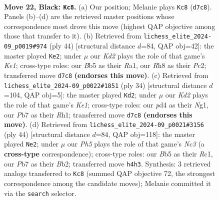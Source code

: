 \documentclass[11pt]{article}
\begin{document}
\begin{figure}[p]
\label{fig:thought-m41}
\end{figure}

\clearpage

\begin{figure}[p]\centering
\begin{subfigure}{0.46\textwidth}\centering
\resizebox{\linewidth}{!}{%
\newchessgame
\chessboard[
  setfen={5b1r/1p1kpp1n/1B1p2p1/1b6/3PP2p/rP2RP2/P4QPP/2K4R b - - 3 22},
  showmover=false,
  pgfstyle=straightmove, color=movearrow, markmove={d7-c8}
]}
\caption{}
\end{subfigure}\hfill
\begin{subfigure}{0.46\textwidth}\centering
\resizebox{\linewidth}{!}{%
\newchessgame
\chessboard[
  setfen={r1b3R1/pp1k1p2/4pq1P/2p5/P2pP3/N2P4/1PPB3p/R3K3 w Q - 2 23},
  showmover=false,
  pgfstyle=straightmove, color=movearrow, markmove={e1-e2}
]}
\caption{}
\end{subfigure}
\\[4pt]
\begin{subfigure}{0.46\textwidth}\centering
\resizebox{\linewidth}{!}{%
\newchessgame
\chessboard[
  setfen={r1b1k2r/p2p1ppp/1p2p3/4P3/5P2/1Pn5/2P3PP/R3KBNR w Kkq - 0 18},
  showmover=false,
  pgfstyle=straightmove, color=movearrow, markmove={e1-d2}
]}
\caption{}
\end{subfigure}\hfill
\begin{subfigure}{0.46\textwidth}\centering
\resizebox{\linewidth}{!}{%
\newchessgame
\chessboard[
  setfen={3rrqk1/p5pp/1p2p3/2p1Rp2/2P5/1PN5/PBB2PPP/2R3K1 w - - 0 23},
  showmover=false,
  pgfstyle=straightmove, color=movearrow, markmove={c3-e2}
]}
\caption{}
\end{subfigure}
\caption{\textbf{Move 22, Black: \texttt{Kc8}.} (a) Our position; Melanie plays \texttt{Kc8} (\texttt{d7c8}). Panels (b)--(d) are the retrieved master positions whose correspondence most drove this move (highest QAP objective among those that transfer to it). (b) Retrieved from \texttt{lichess\_elite\_2024-09\_p0019\#974} (ply 44) [structural distance $d$=84, QAP obj=42]: the master played \texttt{Ke2}; under $\mu$ our \emph{Kd2} plays the role of that game's \emph{Ke1}; cross-type roles: our \emph{B}b5 as their \emph{R}a1, our \emph{R}h8 as their \emph{P}c2; transferred move \texttt{d7c8} \textbf{(endorses this move)}. (c) Retrieved from \texttt{lichess\_elite\_2024-09\_p0022\#1851} (ply 34) [structural distance $d$=104, QAP obj=5]: the master played \texttt{Kd2}; under $\mu$ our \emph{Kd2} plays the role of that game's \emph{Ke1}; cross-type roles: our \emph{p}d4 as their \emph{N}g1, our \emph{P}b7 as their \emph{R}h1; transferred move \texttt{d7c8} \textbf{(endorses this move)}. (d) Retrieved from \texttt{lichess\_elite\_2024-09\_p0021\#3156} (ply 44) [structural distance $d$=84, QAP obj=118]: the master played \texttt{Ne2}; under $\mu$ our \emph{Ph5} plays the role of that game's \emph{Nc3} (a \textbf{cross-type} correspondence); cross-type roles: our \emph{B}b5 as their \emph{R}c1, our \emph{P}b7 as their \emph{B}b2; transferred move \texttt{h4h3}. Synthesis: 3 retrieved analogs transferred to \texttt{Kc8} (summed QAP objective 72, the strongest correspondence among the candidate moves); Melanie committed it via the \texttt{search} selector.}

\end{figure}
\end{document}
